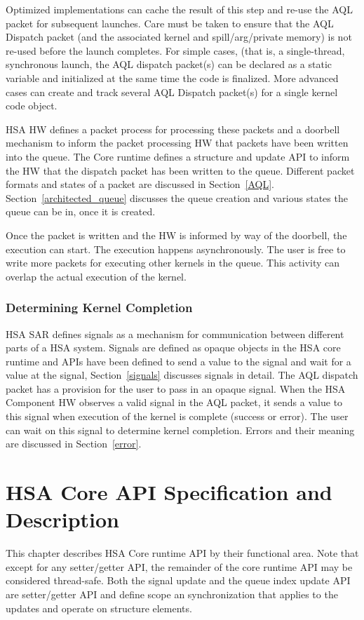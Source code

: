 \documentclass{book}
\begin{document}
Optimized implementations can cache the
result of this step and re-\/use the AQL packet for subsequent
launches. Care must be taken to ensure that the AQL Dispatch
packet (and the associated kernel and spill/arg/private memory) is
not re-\/used before the launch completes. For simple cases, (that
is, a single-\/thread, synchronous launch, the
AQL dispatch packet(s) can be declared as a static variable
and initialized at the same time the code is finalized. More
advanced cases can create and track several
AQL Dispatch packet(s) for a single kernel code object.

HSA HW defines a packet process for processing these packets and a doorbell
mechanism to inform the packet processing HW that packets have been
written into the queue. The Core runtime defines a structure and update
API to inform the HW that the dispatch packet has been written to the
queue. Different packet formats and states of a packet are discussed
in Section~\ref{AQL}. Section~\ref{architected_queue} discusses the
queue creation and various states the queue can be in, once it is
created.

Once the packet is written and the HW is informed by way of the
doorbell, the execution can start. The execution happens
asynchronously. The user is free to write more packets for executing
other kernels in the queue. This activity can overlap the actual
execution of the kernel.

\subsection{Determining Kernel Completion}
HSA SAR defines signals as a mechanism for communication between
different parts of a HSA system. Signals are defined as opaque
objects in the HSA core runtime and APIs have been defined to send a
value to the signal and wait for a value at the signal,
Section~\ref{signals} discusses signals in detail. The AQL dispatch
packet has a provision for the user to pass in an opaque signal.
When the HSA Component HW observes a valid signal in the AQL packet,
it sends a value to this signal when execution of the kernel is
complete (success or error). The user can wait on this signal to
determine kernel completion. Errors and their
meaning are discussed in Section~\ref{error}.


\chapter{HSA Core API Specification and Description} \label{coreapi}
\hypertarget{coreapi}{}
This chapter describes HSA Core runtime API by their functional
area. Note that except for any setter/getter API, the remainder of
the core runtime API may be considered thread-safe.  Both the signal
update and the queue index update API are setter/getter API and
define scope an synchronization that applies to the updates and
operate on structure elements.
\end{document}
